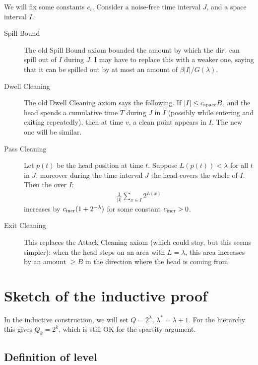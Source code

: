 \documentclass[12pt]{memoir}
\renewcommand{\le}{\leq}
\renewcommand{\ge}{\geq}
\def\B{B}
\newcommand{\Tu}{T}
\newcommand{\cns}[1]{c_{\textrm{\upshape #1}}}
\newcommand{\cSpace}{\cns{space}}
\newcommand{\cIncr}{\cns{incr}}
\begin{document}
We will fix some  constants \( c_{i} \).
Consider a noise-free time interval \( J \), and a space interval \( I \).

\begin{description}
\item[Spill Bound] 
The old Spill Bound axiom bounded the amount by which the dirt can spill out
of \( I \) during \( J \).
I may have to replace this with a weaker one, saying
that it can be spilled out by at most an amount of \( \beta |I|/G(\lambda) \).

\item[Dwell Cleaning]
The old Dwell Cleaning axiom says the following.
If \( |I| \le \cSpace\B \), and the head spends a cumulative time  \( \Tu \)  during \( J \)
in \( I \) (possibly while entering and exiting repeatedly),
then at time \( v \), a clean point appears in \( I \).
The new one will be similar.


\item[Pass Cleaning]
Let \( p(t) \) be the head position at time \( t \).
Suppose \( L(p(t))<\lambda \) for all \( t \) in \( J \), moreover
during the time interval \( J \) the head covers the whole of \( I \).
Then the  over \( I \):
 \begin{align}\label{eq:score}
  \frac{1}{|I|} \sum_{x\in I}2^{L(x)}
 \end{align}
increases by \( \cIncr(1+2^{-\lambda}) \) for some constant \( \cIncr>0 \).

\item[Exit Cleaning]
This replaces the Attack Cleaning axiom (which could stay, but this seems simpler):
when the head steps on an area with \( L=\lambda \), 
this area increases by an amount \( \ge\B \) in the direction where the 
head is coming from.
\end{description}


\section{Sketch of the inductive proof}

In the inductive construction, we will set \( Q=2^{\lambda} \), \( \lambda^{*}=\lambda+1 \).
For the hierarchy this gives \( Q_{k}=2^{k} \), which is still OK for the sparsity argument.

\subsection{Definition of level}
\end{document}
